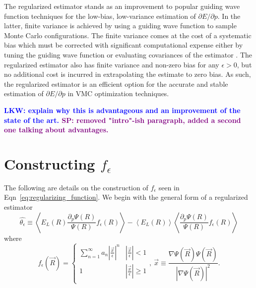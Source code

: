 \documentclass[twocolumn]{revtex4-1}
\newcommand{\lucas}[1]{\textbf{\textcolor{blue}{LKW: #1}}}
\newcommand{\shivesh}[1]{\textbf{\textcolor{purple}{SP: #1}}}
\begin{document}
The regularized estimator stands as an improvement to popular guiding wave function techniques \cite{Avella, Attaccalite2008, Zen2013, Assaraf1999, doi:10.1063/1.1286598, Assaraf2003} for the low-bias, low-variance estimation of $\partial E/\partial p$.
In the latter, finite variance is achieved by using a guiding wave function to sample Monte Carlo configurations.
The finite variance comes at the cost of a systematic bias which must be corrected with significant computational expense either by tuning the guiding wave function or evaluating covariances of the estimator \cite{ Toulouse2015}.
The regularized estimator also has finite variance and non-zero bias for any $\epsilon > 0$, but no additional cost is incurred in extrapolating the estimate to zero bias.
As such, the regularized estimator is an efficient option for the accurate and stable estimation of $\partial E/\partial p$ in VMC optimization techniques.

\lucas{explain why this is advantageous and an improvement of the state of the art. }
\shivesh{removed "intro"-ish paragraph, added a second one talking about advantages.}

%


\appendix*
\section{Constructing $f_\epsilon$}
The following are details on the construction of $f_\epsilon$ seen in Eqn~\ref{eq:regularizing_function}. 
We begin with the general form of a regularized estimator
$$
\hat{\theta_\epsilon} \equiv
\left\langle E_L(R) \frac{\partial_p \Psi(R)}{\Psi(R)} f_\epsilon(R) \right\rangle - \left\langle E_L(R) \right \rangle \left \langle \frac{\partial_p \Psi(R)}{\Psi(R)} f_\epsilon(R) \right\rangle
$$
where 
\begin{equation}
f_\epsilon(\vec{R}) = \begin{cases} 
      \sum_{n=1}^{\infty} a_n |\frac{\vec{x}}{\epsilon}|^n & |\frac{\vec{x}}{\epsilon}| < 1 \\
      1 & |\frac{\vec{x}}{\epsilon}| \ge 1 \\
   \end{cases},\ \vec{x} \equiv \frac{\nabla \Psi(\vec{R}) \Psi(\vec{R})}{|\nabla \Psi(\vec{R})|^2}.
\end{equation} 
\end{document}
